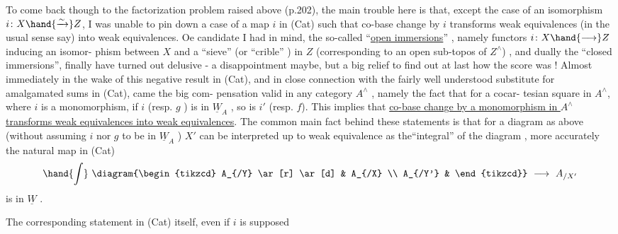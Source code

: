 To come back though to the factorization problem raised above (p.202),
the main trouble here is that, except the case of an isomorphism $i\colon X\hand{\xrightarrow{\sim}}Z$,
I was unable to pin down a  case of a  map $i$ in (Cat) such that
co-base change by $i$ transforms weak equivalences (in the usual sense say)
into weak equivalences. Oe candidate I had in mind, the so-called
``\uline{open immersions}'' ,  namely functors $i\colon X\hand{\longrightarrow}Z$ inducing an isomor-%
phism between $X$ and a ``sieve'' (or ``crible'' ) in $Z$ (corresponding to an
open sub-topos of $Z^{\wedge}$) , and dually the ``closed immersions'', finally have
turned out delusive - a disappointment maybe, but  a big relief to find
out at last how the score was ! Almost immediately in the wake of this
negative result in (Cat), and in close connection with the fairly well
understood \hand{$\int$} substitute for amalgamated sums in (Cat), came the big com-%
pensation valid in any category $A^{\wedge}$ , namely the fact that for a cocar-%
tesian square
in $A^{\wedge}$, where $i$ is a monomorphism, if $i$ (resp. $g$ ) is in $\underline{W}_A$ , so is
$i'$ (resp. $f$). This implies that \uline{co-base change by a monomorphism in $A^{\wedge}$}
\uline{transforms weak equivalences into weak equivalences}. The common main fact
behind these statements is that for a diagram as above (without assuming
$i$ nor $g$ to be in $\underline{W}_A$ )\hand{,} $X'$ can be interpreted up to weak equivalence as
the``integral'' of the diagram
,
more accurately\hand{,} the natural map in (Cat)
\[\hand{\int}\ \diagram{\begin{tikzcd}
A_{/Y} \ar[r] \ar[d] & A_{/X} \\
A_{/Y'} &
\end{tikzcd}}\ \longrightarrow\ A_{/X'}\]
is in $\underline{W}$ .

The corresponding statement in (Cat) itself, even if $i$ is supposed

